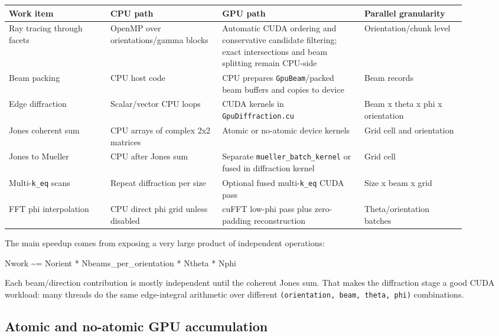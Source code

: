 \documentclass[
  10pt,
  a4paper,
]{article}
\newenvironment{Shaded}{}{}
\newcommand{\NormalTok}[1]{#1}
\begin{document}
\begin{longtable}[]{@{}L{0.20\linewidth}L{0.22\linewidth}L{0.28\linewidth}L{0.20\linewidth}@{}}
\toprule\noalign{}
Work item & CPU path & GPU path & Parallel granularity \\
\midrule\noalign{}
\endhead
\bottomrule\noalign{}
\endlastfoot
Ray tracing through facets & OpenMP over orientations/gamma blocks &
Automatic CUDA ordering and conservative candidate filtering; exact
intersections and beam splitting remain CPU-side & Orientation/chunk level \\
Beam packing & CPU host code & CPU prepares \texttt{GpuBeam}/packed beam
buffers and copies to device & Beam records \\
Edge diffraction & Scalar/vector CPU loops & CUDA kernels in
\texttt{GpuDiffraction.cu} & Beam x theta x phi x orientation \\
Jones coherent sum & CPU arrays of complex 2x2 matrices & Atomic or
no-atomic device kernels & Grid cell and orientation \\
Jones to Mueller & CPU after Jones sum & Separate
\texttt{mueller\_batch\_kernel} or fused in diffraction kernel & Grid
cell \\
Multi-\texttt{k\_eq} scans & Repeat diffraction per size & Optional
fused multi-\texttt{k\_eq} CUDA pass & Size x beam x grid \\
FFT phi interpolation & CPU direct phi grid unless disabled & cuFFT
low-phi pass plus zero-padding reconstruction & Theta/orientation
batches \\
\end{longtable}

The main speedup comes from exposing a very large product of independent
operations:

\begin{Shaded}
\begin{Highlighting}[]
\NormalTok{Nwork \textasciitilde{}= Norient * Nbeams\_per\_orientation * Ntheta * Nphi}
\end{Highlighting}
\end{Shaded}

Each beam/direction contribution is mostly independent until the
coherent Jones sum. That makes the diffraction stage a good CUDA
workload: many threads do the same edge-integral arithmetic over
different \texttt{(orientation,\ beam,\ theta,\ phi)} combinations.

\subsection{Atomic and no-atomic GPU
accumulation}\label{atomic-and-no-atomic-gpu-accumulation}
\end{document}
